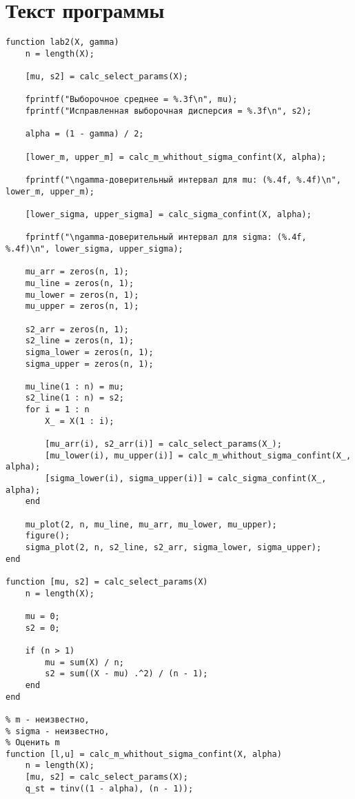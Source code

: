 \chapter{Текст программы}

\begin{center}
\captionsetup{justification=raggedright,singlelinecheck=off}
\begin{lstlisting}[label=lst:lab]
function lab2(X, gamma)
    n = length(X);
    
    [mu, s2] = calc_select_params(X);
    
    fprintf("Выборочное среднее = %.3f\n", mu);
    fprintf("Исправленная выборочная дисперсия = %.3f\n", s2);

    alpha = (1 - gamma) / 2;

    [lower_m, upper_m] = calc_m_whithout_sigma_confint(X, alpha);

    fprintf("\ngamma-доверительный интервал для mu: (%.4f, %.4f)\n", lower_m, upper_m);

    [lower_sigma, upper_sigma] = calc_sigma_confint(X, alpha);

    fprintf("\ngamma-доверительный интервал для sigma: (%.4f, %.4f)\n", lower_sigma, upper_sigma);

    mu_arr = zeros(n, 1);
    mu_line = zeros(n, 1);
    mu_lower = zeros(n, 1);
    mu_upper = zeros(n, 1);

    s2_arr = zeros(n, 1);
    s2_line = zeros(n, 1);
    sigma_lower = zeros(n, 1);
    sigma_upper = zeros(n, 1);

    mu_line(1 : n) = mu;
    s2_line(1 : n) = s2;
    for i = 1 : n
        X_ = X(1 : i);

        [mu_arr(i), s2_arr(i)] = calc_select_params(X_);
        [mu_lower(i), mu_upper(i)] = calc_m_whithout_sigma_confint(X_, alpha);
        [sigma_lower(i), sigma_upper(i)] = calc_sigma_confint(X_, alpha);
    end
    
    mu_plot(2, n, mu_line, mu_arr, mu_lower, mu_upper);
    figure();
    sigma_plot(2, n, s2_line, s2_arr, sigma_lower, sigma_upper);
end

function [mu, s2] = calc_select_params(X)
    n = length(X);
    
    mu = 0;
    s2 = 0;

    if (n > 1)
        mu = sum(X) / n;
        s2 = sum((X - mu) .^2) / (n - 1);
    end
end

% m - неизвестно, 
% sigma - неизвестно,
% Оценить m
function [l,u] = calc_m_whithout_sigma_confint(X, alpha)
    n = length(X);
    [mu, s2] = calc_select_params(X);
    q_st = tinv((1 - alpha), (n - 1));
    

\end{lstlisting}
\end{center}
